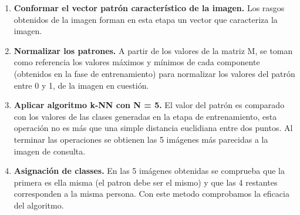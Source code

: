 \begin{enumerate}
\begin{enumerate}
	\end{enumerate}
	\item \textbf{Conformar el vector patr\'on caracter\'istico de la imagen.} Los rasgos obtenidos de la imagen forman en esta etapa un vector que caracteriza la imagen.	
	\item \textbf{Normalizar los patrones.} A partir de los valores de la matriz M, se toman como referencia los valores m\'aximos y m\'inimos de cada componente (obtenidos en la fase de entrenamiento) para normalizar los valores del patr\'on entre 0 y 1, de la imagen en cuesti\'on.
	\item \textbf{Aplicar algoritmo k-NN con N = 5.} El valor del patr\'on es comparado con los valores de las clases generadas en la etapa de entrenamiento, esta operaci\'on no es m\'as que una simple distancia euclidiana entre dos puntos. Al terminar las operaciones se obtienen las 5 im\'agenes m\'as parecidas a la imagen de consulta.
	\item \textbf{Asignaci\'on de classes.} En las 5 im\'agenes obtenidas se comprueba que la primera es ella misma (el patron debe ser el mismo) y que las 4 restantes corresponden a la misma persona. Con este metodo comprobamos la eficacia del algoritmo.
\end{enumerate}



















